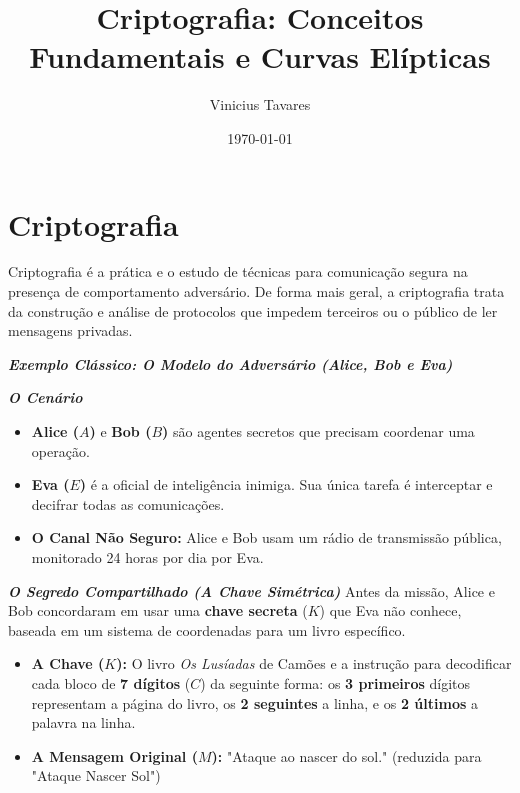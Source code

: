 \documentclass{article}
\title{Criptografia: Conceitos Fundamentais e Curvas Elípticas}
\author{Vinicius Tavares}
\date{\today}
\theoremstyle{definicao_estilo}
\begin{document}
\maketitle

\section{Criptografia}

Criptografia é a prática e o estudo de técnicas para comunicação segura na presença de comportamento adversário. De forma mais geral, a criptografia trata da construção e análise de protocolos que impedem terceiros ou o público de ler mensagens privadas.

\par\vspace{1em}

\textbf{\textit{Exemplo Clássico: O Modelo do Adversário (Alice, Bob e Eva)}}

\par\vspace{0.5em}

\textbf{\textit{O Cenário}}
\begin{itemize}
\item \textbf{Alice ($A$)} e \textbf{Bob ($B$)} são agentes secretos que precisam coordenar uma operação.
\item \textbf{Eva ($E$)} é a oficial de inteligência inimiga. Sua única tarefa é interceptar e decifrar todas as comunicações.
\item \textbf{O Canal Não Seguro:} Alice e Bob usam um rádio de transmissão pública, monitorado 24 horas por dia por Eva.
\end{itemize}

\par\vspace{0.5em}

\textbf{\textit{O Segredo Compartilhado (A Chave Simétrica)}}
Antes da missão, Alice e Bob concordaram em usar uma \textbf{chave secreta} ($K$) que Eva não conhece, baseada em um sistema de coordenadas para um livro específico.
\begin{itemize}
\item \textbf{A Chave ($K$):} O livro \textit{Os Lusíadas} de Camões e a instrução para decodificar cada bloco de \textbf{7 dígitos} ($C$) da seguinte forma: os \textbf{3 primeiros} dígitos representam a página do livro, os \textbf{2 seguintes} a linha, e os \textbf{2 últimos} a palavra na linha.
\item \textbf{A Mensagem Original ($M$):} "Ataque ao nascer do sol." (reduzida para "Ataque Nascer Sol")
\end{itemize}
\end{document}
